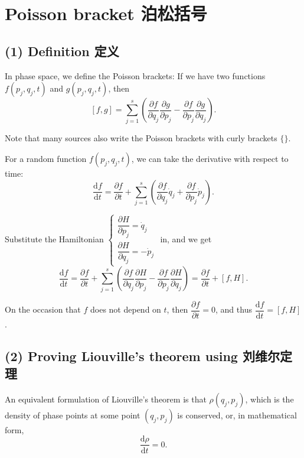 \section{Poisson bracket
泊松括号}\label{poisson-bracket-ux6ccaux677eux62ecux53f7}

\subsection*{(1) Definition 定义}\label{definition-ux5b9aux4e49-2}

In phase space, we define the Poisson brackets: If we have two functions
\(f(p_j, q_j, t)\) and \(g(p_j, q_j, t)\), then
\[[f, g] = \sum_{j = 1}^{s} \left( \frac{\partial f}{\partial q_j} \frac{\partial g}{\partial p_j} - \frac{\partial f}{\partial p_j} \frac{\partial g}{\partial q_j} \right).\]

Note that many sources also write the Poisson brackets with curly brackets $\{\}$. 

For a random function \(f(p_j, q_j, t)\), we can take the derivative
with respect to time:
\[\frac{\mathrm{d}f}{\mathrm{d}t} = \frac{\partial f}{\partial t} + \sum_{j = 1}^{s} \left( \frac{\partial f}{\partial q_j} \dot{q}_j + \frac{\partial f}{\partial p_j} \dot{p}_j \right).\]

Substitute the Hamiltonian
\(\left\{  \begin{array} {l}  \dfrac{\partial H}{\partial p_j}=\dot q_j \\[1.5ex]  \dfrac{\partial H}{\partial q_j}=-\dot p_j  \end{array} \right.\)
in, and we get
\[\frac{\mathrm{d}f}{\mathrm{d}t} = \frac{\partial f}{\partial t} + \sum_{j = 1}^{s} \left( \frac{\partial f}{\partial q_j} \dfrac{\partial H}{\partial p_j} - \frac{\partial f}{\partial p_j} \dfrac{\partial H}{\partial q_j} \right) = \frac{\partial f}{\partial t} + [f, H].\]

On the occasion that \(f\) does not depend on \(t\), then
\(\dfrac{\partial f}{\partial t} = 0\), and thus
\(\dfrac{\mathrm{d}f}{\mathrm{d}t} = [f, H]\).

\subsection*{(2) Proving Liouville's theorem using
刘维尔定理}\label{proving-liouvilles-theorem-using-ux5218ux7ef4ux5c14ux5b9aux7406}

An equivalent formulation of Liouville's theorem is that
\(\rho(q_j, p_j)\), which is the density of phase points at some point
\((q_j, p_j)\) is conserved, or, in mathematical form,
\[\frac{\mathrm{d} \rho}{\mathrm{d}t} = 0.\]

